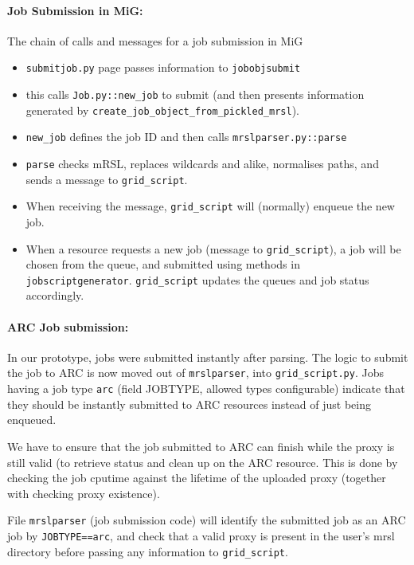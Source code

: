 \documentclass[11pt]{article}
\begin{document}
\paragraph{Job Submission in MiG:}
The chain of calls and messages for a job submission in MiG
\begin{itemize}
  \item \verb!submitjob.py! page passes information to \verb!jobobjsubmit!
  \item this calls \verb!Job.py::new_job! to submit (and then presents
    information generated by
    \verb!create_job_object_from_pickled_mrsl!).
  \item \verb!new_job! defines the job ID and then calls
    \verb!mrslparser.py::parse!
  \item \verb!parse! checks mRSL, replaces wildcards and alike,
    normalises paths, and sends a message to \verb!grid_script!.
  \item When receiving the message, \verb!grid_script! will (normally)
    enqueue the new job.
  \item When a resource requests a new job (message to
    \verb!grid_script!), a job will be chosen from the queue, and
    submitted using methods in
    \verb!jobscriptgenerator!. \verb!grid_script! updates the queues
    and job status accordingly.
\end{itemize}

\paragraph{ARC Job submission:} 
 In our prototype, jobs were submitted instantly after parsing. The
 logic to submit the job to ARC is now moved out of \verb!mrslparser!,
 into \verb!grid_script.py!. Jobs having a job type \verb!arc! (field
 JOBTYPE, allowed types configurable) indicate that they should be
 instantly submitted to ARC resources instead of just being enqueued.

We have to ensure that the job submitted to ARC can finish while the
 proxy is still valid (to retrieve status and clean up on the ARC
 resource. This is done by checking the job cputime against the
 lifetime of the uploaded proxy (together with checking proxy
 existence).
 

%
File \verb!mrslparser! (job submission code) will identify the
submitted job as an ARC job by \verb!JOBTYPE==arc!, and check that a
valid proxy is present in the user's mrsl directory before passing any
information to \verb!grid_script!.
\end{document}
